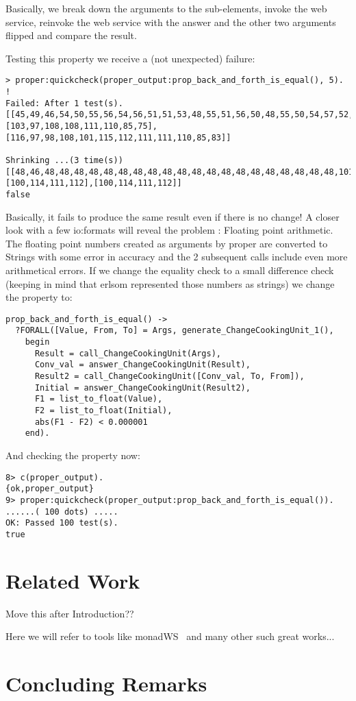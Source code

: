 \documentclass[submission,copyright,a4]{eptcs}
\begin{document}
Basically, we break down the arguments to the sub-elements, invoke the web service, reinvoke the web service with the answer and the other two arguments flipped and compare the result. 

Testing this property we receive a (not unexpected) failure:

\begin{lstlisting}
> proper:quickcheck(proper_output:prop_back_and_forth_is_equal(), 5).
!
Failed: After 1 test(s).
[[45,49,46,54,50,55,56,54,56,51,51,53,48,55,51,56,50,48,55,50,54,57,52,101,45,48,49],[103,97,108,108,111,110,85,75],[116,97,98,108,101,115,112,111,111,110,85,83]]

Shrinking ...(3 time(s))
[[48,46,48,48,48,48,48,48,48,48,48,48,48,48,48,48,48,48,48,48,48,48,101,43,48,48],[100,114,111,112],[100,114,111,112]]
false
\end{lstlisting}

Basically, it fails to produce the same result even if there is no change! A closer look with a few io:formats will reveal the problem : Floating point arithmetic. The floating point numbers created as arguments by proper are converted to Strings with some error in accuracy and the 2 subsequent calls include even more arithmetical errors. If we change the equality check to a small difference check (keeping in mind that erlsom represented those numbers as strings) we change the property to:

\begin{lstlisting}
prop_back_and_forth_is_equal() ->
  ?FORALL([Value, From, To] = Args, generate_ChangeCookingUnit_1(),
    begin
      Result = call_ChangeCookingUnit(Args),
      Conv_val = answer_ChangeCookingUnit(Result),
      Result2 = call_ChangeCookingUnit([Conv_val, To, From]),
      Initial = answer_ChangeCookingUnit(Result2),
      F1 = list_to_float(Value),
      F2 = list_to_float(Initial),
      abs(F1 - F2) < 0.000001
    end).
\end{lstlisting}

And checking the property now:

\begin{lstlisting}
8> c(proper_output).                                                  
{ok,proper_output}
9> proper:quickcheck(proper_output:prop_back_and_forth_is_equal()).
......( 100 dots) .....
OK: Passed 100 test(s).
true
\end{lstlisting}

\section{Related Work}
Move this after Introduction??

Here we will refer to tools like monadWS~\cite{monadWS@AST-11} and
many other such great works...

\section{Concluding Remarks}



\end{document}
